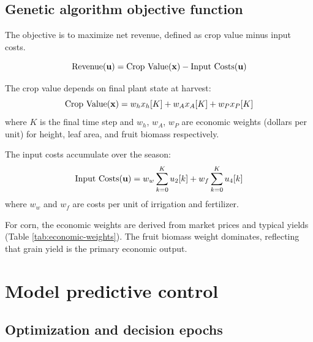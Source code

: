 \documentclass[pdflatex,sn-mathphys-num]{sn-jnl}
\begin{document}
\subsection{Genetic algorithm objective function}\label{subsec:objective}

The objective is to maximize net revenue, defined as crop value minus input costs.

\begin{equation}
\text{Revenue}({\bf u}) = \text{Crop Value}({\bf x}) - \text{Input Costs}({\bf u})
\label{eqn:cost-function}
\end{equation}

The crop value depends on final plant state at harvest:
\begin{equation}
\text{Crop Value}({\bf x}) = w_{h}x_{h}[K] + w_{A}x_{A}[K] + w_{P}x_{P}[K]
\label{eqn:crop-value}
\end{equation}
where $K$ is the final time step and $w_{h}$, $w_{A}$, $w_{P}$ are economic weights (dollars per unit) for height, leaf area, and fruit biomass respectively.

The input costs accumulate over the season:
\begin{equation}
\text{Input Costs}({\bf u}) = w_{w}\sum_{k=0}^{K}u_{2}[k] + w_{f}\sum_{k=0}^{K}u_{4}[k]
\label{eqn:input-costs}
\end{equation}
where $w_{w}$ and $w_{f}$ are costs per unit of irrigation and fertilizer.

For corn, the economic weights are derived from market prices and typical yields (Table \ref{tab:economic-weights}). The fruit biomass weight dominates, reflecting that grain yield is the primary economic output.

\section{Model predictive control}\label{sec:mpc}

\subsection{Optimization and decision epochs}\label{subsec:optimization}
\end{document}

